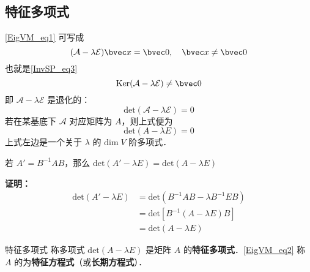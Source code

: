 \subsection{特征多项式}
\autoref{EigVM_eq1} 可写成
\begin{equation}
(\mathcal{A-\lambda E})\bvec x=\bvec 0,\quad \bvec x\neq\bvec 0
\end{equation}
也就是\autoref{InvSP_eq3}~ 
\begin{equation}
\mathrm{Ker(\mathcal{A}-\lambda\mathcal{E})}\neq\bvec 0
\end{equation}
即 $\mathcal{A-\lambda E}$ 是退化的：
\begin{equation}
\mathrm{det}(\mathcal{A-\lambda E})=0
\end{equation}
若在某基底下 $\mathcal{A}$ 对应矩阵为 $A$，则上式便为
\begin{equation}\label{EigVM_eq2}
\mathrm{det}(A-\lambda E)=0
\end{equation}
上式左边是一个关于 $\lambda$ 的 $\mathrm{dim}\;{V}$ 阶多项式．
\begin{theorem}{}
若 $A'=B^{-1}AB$，那么 $\mathrm{det}(A'-\lambda E)=\mathrm{det}(A-\lambda E)$
\end{theorem}
\textbf{证明：}
\begin{equation}
\begin{aligned}
\mathrm{det}(A'-\lambda E)&=\mathrm{det}(B^{-1}AB-\lambda B^{-1}EB)\\
&=\mathrm{det}[B^{-1}(A-\lambda E)B]\\
&=\mathrm{det}(A-\lambda E)
\end{aligned}
\end{equation}
\begin{definition}{特征多项式}
称多项式 $\mathrm{det}(A-\lambda E)$ 是矩阵 $A$ 的\textbf{特征多项式}．\autoref{EigVM_eq2} 称 $A$ 的为\textbf{特征方程式}（或\textbf{长期方程式}）．
\end{definition}